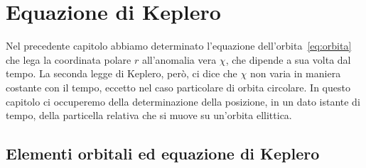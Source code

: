\chapter{Equazione di Keplero}
\label{chap:equazione-keplero}

Nel precedente capitolo abbiamo determinato l'equazione
dell'orbita~\eqref{eq:orbita} che lega la coordinata polare $r$ all'anomalia
vera $\chi$, che dipende a sua volta dal tempo. La seconda legge di Keplero,
però, ci dice che $\chi$ non varia in maniera costante con il tempo, eccetto nel
caso particolare di orbita circolare. In questo capitolo ci occuperemo della
determinazione della posizione, in un dato istante di tempo, della particella
relativa che si muove su un'orbita ellittica.

\section{Elementi orbitali ed equazione di Keplero}
\label{sec:elementi-orbitali}

